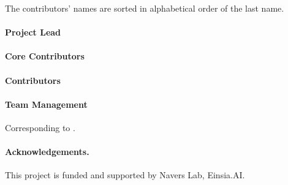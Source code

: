 The contributors' names are sorted in alphabetical order of the last name.

\paragraph{Project Lead}

\paragraph{Core Contributors}

\paragraph{Contributors}

\paragraph{Team Management}

\vspace{4pt}
\noindent Corresponding to .

\paragraph{Acknowledgements.} This project is funded and supported by Navers Lab, Einsia.AI.
